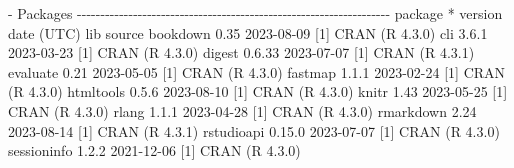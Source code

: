 \documentclass[
  10pt,
  a4paper,
]{book}
\newenvironment{Shaded}{\begin{snugshade}}{\end{snugshade}}
\newcommand{\DecValTok}[1]{\textcolor[rgb]{0.68,0.00,0.00}{#1}}
\newcommand{\FloatTok}[1]{\textcolor[rgb]{0.68,0.00,0.00}{#1}}
\newcommand{\FunctionTok}[1]{\textcolor[rgb]{0.28,0.35,0.67}{#1}}
\newcommand{\NormalTok}[1]{\textcolor[rgb]{0.00,0.46,0.62}{#1}}
\newcommand{\SpecialCharTok}[1]{\textcolor[rgb]{0.37,0.37,0.37}{#1}}
\begin{document}
\begin{Shaded}
\begin{Highlighting}[]
\SpecialCharTok{{-}}\NormalTok{ Packages }\SpecialCharTok{{-}{-}{-}{-}{-}{-}{-}{-}{-}{-}{-}{-}{-}{-}{-}{-}{-}{-}{-}{-}{-}{-}{-}{-}{-}{-}{-}{-}{-}{-}{-}{-}{-}{-}{-}{-}{-}{-}{-}{-}{-}{-}{-}{-}{-}{-}{-}{-}{-}{-}{-}{-}{-}{-}{-}{-}{-}{-}{-}{-}{-}{-}{-}{-}{-}{-}{-}}
\NormalTok{ package       }\SpecialCharTok{*}\NormalTok{ version }\FunctionTok{date}\NormalTok{ (UTC) lib source}
\NormalTok{ bookdown        }\FloatTok{0.35}    \DecValTok{2023{-}08{-}09}\NormalTok{ [}\DecValTok{1}\NormalTok{] }\FunctionTok{CRAN}\NormalTok{ (R }\DecValTok{4}\NormalTok{.}\FloatTok{3.0}\NormalTok{)}
\NormalTok{ cli             }\DecValTok{3}\NormalTok{.}\FloatTok{6.1}   \DecValTok{2023{-}03{-}23}\NormalTok{ [}\DecValTok{1}\NormalTok{] }\FunctionTok{CRAN}\NormalTok{ (R }\DecValTok{4}\NormalTok{.}\FloatTok{3.0}\NormalTok{)}
\NormalTok{ digest          }\DecValTok{0}\NormalTok{.}\FloatTok{6.33}  \DecValTok{2023{-}07{-}07}\NormalTok{ [}\DecValTok{1}\NormalTok{] }\FunctionTok{CRAN}\NormalTok{ (R }\DecValTok{4}\NormalTok{.}\FloatTok{3.1}\NormalTok{)}
\NormalTok{ evaluate        }\FloatTok{0.21}    \DecValTok{2023{-}05{-}05}\NormalTok{ [}\DecValTok{1}\NormalTok{] }\FunctionTok{CRAN}\NormalTok{ (R }\DecValTok{4}\NormalTok{.}\FloatTok{3.0}\NormalTok{)}
\NormalTok{ fastmap         }\DecValTok{1}\NormalTok{.}\FloatTok{1.1}   \DecValTok{2023{-}02{-}24}\NormalTok{ [}\DecValTok{1}\NormalTok{] }\FunctionTok{CRAN}\NormalTok{ (R }\DecValTok{4}\NormalTok{.}\FloatTok{3.0}\NormalTok{)}
\NormalTok{ htmltools       }\DecValTok{0}\NormalTok{.}\FloatTok{5.6}   \DecValTok{2023{-}08{-}10}\NormalTok{ [}\DecValTok{1}\NormalTok{] }\FunctionTok{CRAN}\NormalTok{ (R }\DecValTok{4}\NormalTok{.}\FloatTok{3.0}\NormalTok{)}
\NormalTok{ knitr           }\FloatTok{1.43}    \DecValTok{2023{-}05{-}25}\NormalTok{ [}\DecValTok{1}\NormalTok{] }\FunctionTok{CRAN}\NormalTok{ (R }\DecValTok{4}\NormalTok{.}\FloatTok{3.0}\NormalTok{)}
\NormalTok{ rlang           }\DecValTok{1}\NormalTok{.}\FloatTok{1.1}   \DecValTok{2023{-}04{-}28}\NormalTok{ [}\DecValTok{1}\NormalTok{] }\FunctionTok{CRAN}\NormalTok{ (R }\DecValTok{4}\NormalTok{.}\FloatTok{3.0}\NormalTok{)}
\NormalTok{ rmarkdown       }\FloatTok{2.24}    \DecValTok{2023{-}08{-}14}\NormalTok{ [}\DecValTok{1}\NormalTok{] }\FunctionTok{CRAN}\NormalTok{ (R }\DecValTok{4}\NormalTok{.}\FloatTok{3.1}\NormalTok{)}
\NormalTok{ rstudioapi      }\DecValTok{0}\NormalTok{.}\FloatTok{15.0}  \DecValTok{2023{-}07{-}07}\NormalTok{ [}\DecValTok{1}\NormalTok{] }\FunctionTok{CRAN}\NormalTok{ (R }\DecValTok{4}\NormalTok{.}\FloatTok{3.0}\NormalTok{)}
\NormalTok{ sessioninfo     }\DecValTok{1}\NormalTok{.}\FloatTok{2.2}   \DecValTok{2021{-}12{-}06}\NormalTok{ [}\DecValTok{1}\NormalTok{] }\FunctionTok{CRAN}\NormalTok{ (R }\DecValTok{4}\NormalTok{.}\FloatTok{3.0}\NormalTok{)}

\end{Highlighting}
\end{Shaded}
\end{document}

